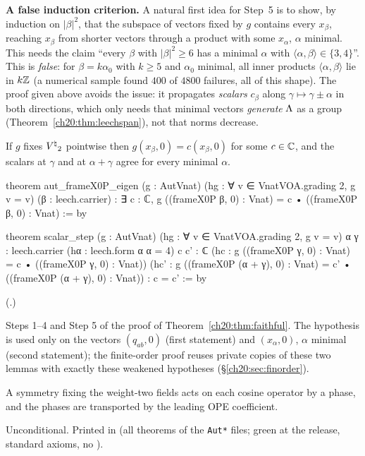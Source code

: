\begin{warning}
\textbf{A false induction criterion.}  A natural first idea for Step~5 is to show, by
induction on $|\beta|^2$, that the subspace of vectors fixed by $g$ contains every $x_\beta$, reaching $x_\beta$ from shorter
vectors through a product with some $x_\alpha$, $\alpha$ minimal.  This needs
the claim ``every $\beta$ with $|\beta|^2\ge6$ has a minimal $\alpha$ with $\langle\alpha,\beta\rangle\in\{3,4\}$''.  This is
\emph{false}: for $\beta=k\alpha_0$ with $k\ge5$ and $\alpha_0$ minimal, all inner products $\langle\alpha,\beta\rangle$ lie in
$k{\mathbb{Z}}$ (a numerical sample found $400$ of $4800$ failures, all of this shape).  The proof given above avoids the issue: it
propagates \emph{scalars} $c_\beta$ along $\gamma\mapsto\gamma\pm\alpha$ in both directions, which only needs that minimal
vectors \emph{generate} ${\Lambda}$ as a group (Theorem~\ref{ch20:thm:leechspan}), not that norms decrease.
\end{warning}

\begin{lemma}\label{ch20:lem:scalars}
If $g$ fixes ${V^{\natural}}_2$ pointwise then $g(x_\beta,0)=c(x_\beta,0)$ for some $c\in{\mathbb{C}}$, and the scalars at $\gamma$ and at
$\alpha+\gamma$ agree for every minimal $\alpha$.
\end{lemma}
\begin{leancode}
theorem aut_frameX0P_eigen (g : AutVnat) (hg : ∀ v ∈ VnatVOA.grading 2, g v = v)
    (β : leech.carrier) :
    ∃ c : ℂ, g ((frameX0P β, 0) : Vnat) = c • ((frameX0P β, 0) : Vnat) := by

theorem scalar_step (g : AutVnat) (hg : ∀ v ∈ VnatVOA.grading 2, g v = v)
    {α γ : leech.carrier} (hα : leech.form α α = 4) {c c' : ℂ}
    (hc : g ((frameX0P γ, 0) : Vnat) = c • ((frameX0P γ, 0) : Vnat))
    (hc' : g ((frameX0P (α + γ), 0) : Vnat) = c' • ((frameX0P (α + γ), 0) : Vnat)) : c = c' := by
\end{leancode}
(.)
\begin{dictionary}
Steps 1--4 and Step 5 of the proof of Theorem~\ref{ch20:thm:faithful}.  The hypothesis  is used only on the
vectors $(q_{ab},0)$ (first statement) and $(x_\alpha,0)$, $\alpha$ minimal (second statement); the finite-order proof
reuses private copies of these two lemmas with exactly these weakened hypotheses (\S\ref{ch20:sec:finorder}).
\end{dictionary}
\begin{physics}
A symmetry fixing the weight-two fields acts on each cosine operator by a phase, and the phases are transported by the
leading OPE coefficient.
\end{physics}
\begin{status}
Unconditional.  Printed in  (all theorems of the \texttt{Aut*} files; green at the release, standard axioms, no ).
\end{status}

